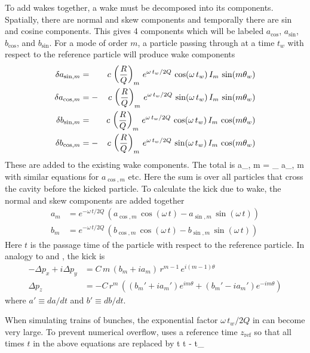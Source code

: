 To add wakes together, a wake must be decomposed into its
components.  Spatially, there are normal and skew components and
temporally there are sin and cosine components. This gives 4
components which will be labeled $a_{\cos}$, $a_{\sin}$, $b_{\cos}$,
and $b_{\sin}$. For a mode of order $m$, a particle passing through at
a time $t_w$ with respect to the reference particle will produce
wake components
\begin{alignat}{2}
  \delta a_{\sin, m} &=  &c \, \left( \frac{R}{Q} \right)_m \,
    e^{\omega \, t_w/ 2 Q} \, \cos (\omega \, t_w) \, I_m \, \sin(m \theta_w) 
    \nonumber \\
  \delta a_{\cos, m} &= -&c \, \left( \frac{R}{Q} \right)_m \,
    e^{\omega \, t_w/ 2 Q} \, \sin (\omega \, t_w) \, I_m \, \sin(m \theta_w) 
    \label{ac2rq} 
    \\
  \delta b_{\sin, m} &=  &c \, \left( \frac{R}{Q} \right)_m \,
    e^{\omega \, t_w/ 2 Q} \, \cos (\omega \, t_w) \, I_m \, \cos(m \theta_w) 
    \nonumber \\
  \delta b_{\cos, m} &= -&c \, \left( \frac{R}{Q} \right)_m \,
    e^{\omega \, t_w/ 2 Q} \, \sin (\omega \, t_w) \, I_m \, \cos(m \theta_w) 
    \nonumber
\end{alignat}
These are added to the existing wake components. The total is
\Begineq
  a_{\sin, m} = \sum_{} \delta a_{\sin, m}
\Endeq
with similar equations for $a_{\cos, m}$ etc. Here the sum is over all particles
that cross the cavity before the kicked particle. To calculate the kick
due to wake, the normal and skew components are added together
\begin{align}
  a_m &= e^{-\omega \, t/ 2 Q} \, \left( 
    a_{\cos, m} \, \cos (\omega \, t) - a_{\sin, m} \, \sin (\omega \, t) \right) 
    \label{akz2q} \\
  b_m &= e^{-\omega \, t/ 2 Q} \, \left(
    b_{\cos, m} \, \cos (\omega \, t) - b_{\sin, m} \, \sin (\omega \, t) \right) \nonumber 
\end{align}
Here $t$ is the passage time of the particle with respect to the
reference particle. In analogy to  and , the kick
is
\begin{align}
  -\Delta p_x + i\Delta p_y &= C \, 
    m \, (b_m + i a_m) \, r^{m-1} \, e^{i (m-1) \theta} 
    \label{ppcmbar} \\
  \Delta p_z &= -C \, r^m \, \left( 
    (b_m' + i a_m') e^{i m\theta} + (b_m' - i a_m') e^{-i m\theta} \right)
\end{align}
where $a' \equiv da/dt$ and $b' \equiv db/dt$.

When simulating trains of bunches, the exponential factor $\omega \, t_w / 2
Q$ in  can become very large. To prevent numerical overflow,
\bmad uses a reference time $z_{\text{ref}}$ so that all times
$t$ in the above equations are replaced by
\Begineq
  t \longrightarrow t - t_{}
\Endeq

